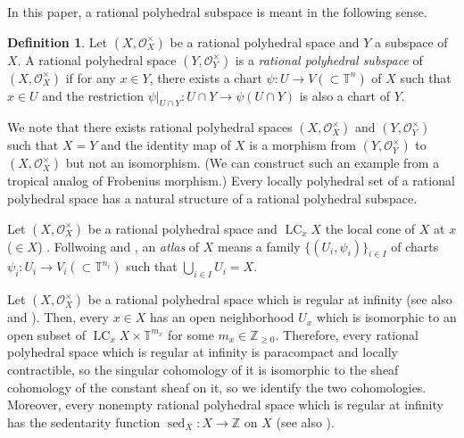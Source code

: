 \documentclass[a4paper,dvipdfmx,reqno,12pt]{amsart}
\theoremstyle{definition}
\newtheorem{definition}[theorem]{Definition}
\newcommand{\opn}[1]{\operatorname{#1}}
\numberwithin{equation}{section}
\begin{document}
In this paper, a rational polyhedral subspace is meant
in the following sense.

\begin{definition}
Let 
$(X,\mathcal{O}_X^{\times})$ be a rational polyhedral space
and $Y$ a subspace of $X$.
A rational polyhedral space $(Y,\mathcal{O}_Y^{\times})$ is 
a \emph{rational polyhedral subspace} of
$(X,\mathcal{O}_X^{\times})$ if 
for any $x\in Y$, there exists a chart
$\psi \colon U \to V (\subset \mathbb{T}^{n})$
of $X$
such that $x\in U$ and the restriction
$\psi|_{U\cap Y}\colon U\cap Y\to 
\psi(U\cap Y)$ is also a chart of $Y$.
\end{definition}
We note that there exists rational polyhedral spaces
$(X,\mathcal{O}_X^{\times})$
and $(Y,\mathcal{O}_Y^{\times})$
such that $X=Y$ and the identity map of $X$ 
is a morphism from $(Y,\mathcal{O}_Y^{\times})$ to
$(X,\mathcal{O}_X^{\times})$ but not an isomorphism.
(We can construct such an example from a tropical analog of
Frobenius morphism.)
Every locally polyhedral set of a rational polyhedral space
\cite[Definition 2.4 (d)]{MR4637248} has a natural 
structure of a rational polyhedral subspace.

Let $(X,\mathcal{O}_X^{\times})$ be a rational polyhedral space
and $\opn{LC}_x X$ the local cone of $X$ at $x$ ($\in X$)
\cite[]{MR4637248}.
Follwoing \cite[Definition 7.1.8]{mikhalkin2018tropical} and 
\cite[Definition 2.3]{demedrano2023chern},
an \emph{atlas} of $X$ means a family 
$\{(U_i,\psi_i)\}_{i\in I}$ of charts 
$\psi_i\colon U_i\to V_i (\subset \mathbb{T}^{n_i})$
\cite[Definition 2.2]{MR4637248}
such that $\bigcup_{i\in I}U_i=X$.

Let $(X,\mathcal{O}_X^{\times})$ be
a rational polyhedral space which is regular at
infinity \cite[]{MR4637248}
(see also \cite[Definition 1.2]{MR3330789}
and \cite[Definition 7.2.4 and Corollary 7.2.11]{mikhalkin2018tropical}).
Then, every $x\in X$ has an open neighborhood $U_x$
which is isomorphic to an open subset of 
$\opn{LC}_x X\times \mathbb{T}^{m_x}$ for some
$m_x\in \mathbb{Z}_{\geq 0}$.
Therefore, every rational polyhedral space which
is regular at infinity is paracompact and
locally contractible,
so the singular cohomology
of it is isomorphic to the sheaf cohomology
of the constant sheaf on it, so we identify
the two cohomologies.
Moreover,
every nonempty
rational polyhedral space which is regular
at infinity has the sedentarity function
$\opn{sed}_X\colon X\to \mathbb{Z}$ on $X$
\cite[Definition 7.2.6]{mikhalkin2018tropical}
(see also \cite[Definition 2.4]{demedrano2023chern}).
\end{document}
